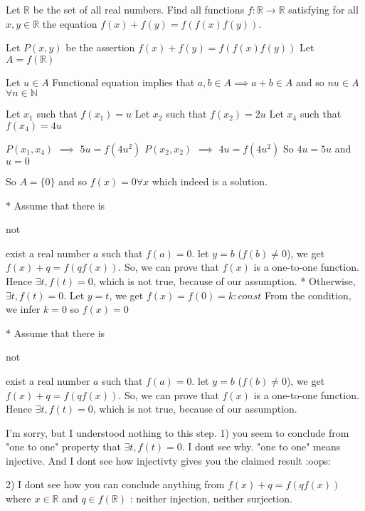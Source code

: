 \begin{solution}
	\begin{tcolorbox}Let $\mathbb{R}$ be the set of all real numbers. Find all functions $f:\mathbb{R}\rightarrow\mathbb{R}$ satisfying for all $x,y\in\mathbb{R}$ the equation $f(x)+f(y)=f(f(x)f(y))$.\end{tcolorbox}
Let $P(x,y)$ be the assertion $f(x)+f(y)=f(f(x)f(y))$
Let $A=f(\mathbb R)$

Let $u\in A$
Functional equation implies that $a,b\in A\implies a+b\in A$ and so $nu\in A$ $\forall n\in\mathbb N$

Let $x_1$ such that $f(x_1)=u$
Let $x_2$ such that $f(x_2)=2u$
Let $x_4$ such that $f(x_4)=4u$

$P(x_1,x_4)$ $\implies$ $5u=f(4u^2)$
$P(x_2,x_2)$ $\implies$ $4u=f(4u^2)$
So $4u=5u$ and $u=0$

So $A=\{0\}$ and so $\boxed{f(x)=0}\forall x$ which indeed is a solution.
\end{solution}



\begin{solution}
	* Assume that there is \begin{bolded}not\end{bolded} exist a real number $a$ such that $f(a)=0$. let $y=b$ ($f(b) \ne 0$), we get $f(x)+q=f(qf(x))$. So, we can prove that $f(x)$ is a one-to-one function. Hence $\exists t, f\left( t \right) = 0$, which is not true, because of our assumption.
* Otherwise, $\exists t, f\left( t \right) = 0$. Let $y=t$, we get $f(x)=f(0)=k:const$
From the condition, we infer $k=0$ so $\boxed{f\left( x \right) = 0}$
\end{solution}



\begin{solution}
	\begin{tcolorbox}* Assume that there is \begin{bolded}not\end{bolded} exist a real number $a$ such that $f(a)=0$. let $y=b$ ($f(b) \ne 0$), we get $f(x)+q=f(qf(x))$. So, we can prove that $f(x)$ is a one-to-one function. Hence $\exists t, f\left( t \right) = 0$, which is not true, because of our assumption.
\end{tcolorbox}
I'm sorry, but I understood nothing to this step.
1) you seem to conclude from "one to one" property that $\exists t, f\left( t \right) = 0$. I dont see why. "one to one" means injective.  And I dont see how injectivty gives you the claimed result :oops:

2) I dont see how you can conclude anything from $f(x)+q=f(qf(x))$ where $x\in\mathbb R$ and $q\in f(\mathbb R)$ : neither injection, neither surjection.
\end{solution}



